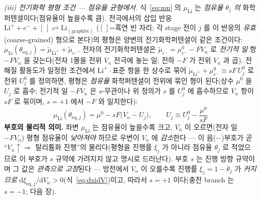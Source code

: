 \documentclass[11pt,a4paper]{article}
\newcommand{\dd}{\mathrm{d}}
\newcommand{\eq}{\mathrm{eq}}
\begin{document}
\emph{(iii) 전기화학 평형 조건 — 점유율 균형에서.} 식~\eqref{eq:mu} 의 $\mu_\mathrm{Li}$ 는 \emph{점유율
$\theta_j$ 의} 화학퍼텐셜이다(점유율이 높을수록 큼). 전극에서의 삽입 반응 $\mathrm{Li}^++e^-+[\,]\rightleftharpoons
\mathrm{Li}_{(\text{graphite})}$ ($[\,]$=흑연 빈 자리; 각 stage 전이 $j$ 를 이 반응의 \emph{유효}(coarse-grained)
형으로 본다)의 평형은 양변의 전기화학퍼텐셜이 같은 조건이다: $\mu_\mathrm{Li}(\theta_{\eq,j})=\tilde\mu_{\mathrm{Li}^+}
+\tilde\mu_{e^-}$. 전자의 전기화학퍼텐셜은 $\tilde\mu_{e^-}=\mu_{e^-}^0-FV_n$ 로 \emph{전기적 일} 항 $-FV_n$ 을
갖는다(전자 1몰을 전위 $V_n$ 전극에 놓는 일; 전하 $-F$ 가 전위 $V_n$ 과 곱). 전해질 활동도가 일정한 조건에서
$\mathrm{Li}^+\cdot$표준 항을 한 상수로 묶어 $\tilde\mu_{\mathrm{Li}^+}+\mu_{e^-}^0\equiv sF\,U_j^0$ 로 전위 $U_j^0$ 를
정의하면, 평형은 \emph{점유율} 화학퍼텐셜이 전위에 묶인 형이 된다(상수 $\mu^0$ 을 $U_j$ 로 흡수; 전기적 일 $-FV_n$ 은
$s$-무관이나 위 정의가 $s$ 를 $U_j^0$ 에 흡수하므로 $V_n$ 항이 $sF$ 로 묶이며, $s=+1$ 에서 $-F$ 와 일치한다):
\begin{equation}
\mu_\mathrm{Li}(\theta_{\eq,j})=\mu^0-sF\big(V_n-U_j\big),\qquad U_j\equiv U_j^0-\frac{\mu^0}{sF}
\label{eq:eqcond}
\end{equation}
\textbf{부호의 물리적 의미.} 좌변 $\mu_\mathrm{Li}$ 는 점유율이 높을수록 크고, $V_n$ 이 오르면(전자 일 $-FV_n$) 평형
점유율이 \emph{낮아져야} 하므로 우변이 $V_n$ 에 \emph{감소}한다 — 이 음($-$)부호가 곧 ``$V_n\uparrow\Rightarrow$
탈리튬화 진행''의 물리다(평형을 진행률 $\xi_j$ 가 아니라 점유율 $\theta_j$ 로 적었으므로 이 부호가 $s$ 규약에 가려지지 않고 명시로
드러난다). 부호 $s$ 는 진행 방향 규약이며 그 값은 \emph{관측으로 고정}된다 — 방전에서 $V_n$ 이 오를수록 진행률
$\xi_j=1-\theta_j$ 가 \emph{커지므로} $\dd\xi_{\eq,j}/\dd V_n>0$(식~\eqref{eq:dxidV})이고, 따라서 $s=+1$ 이다(충전
branch 는 $s=-1$; 다음 장).
\end{document}
